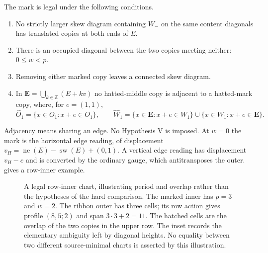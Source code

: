 \documentclass[11pt,a4paper]{amsart}
\numberwithin{equation}{section}
\theoremstyle{plain}
\theoremstyle{definition}
\newcommand{\Z}{\mathbb Z}
\begin{document}
The mark is legal under the following conditions.
\begin{enumerate}
\item[(I)] No strictly larger skew diagram containing \(W_-\) on the same content
 diagonals has translated copies at both ends of \(E\).
\item[(II)] There is an occupied diagonal between the two copies meeting neither:
 \(0\le w<p\).
\item[(III)] Removing either marked copy leaves a connected skew diagram.
\item[(IV)] In \(\boldsymbol E=\bigcup_{k\in\Z}(E+kv)\) no hatted-middle copy
 is adjacent to a hatted-mark copy, where, for \(e=(1,1)\),
 \[
 \widehat O_1=\{x\in O_1:x+e\in O_1\},\qquad
 \widehat W_1=\{x\in\boldsymbol E:x+e\in W_1\}
       \cup\{x\in W_1:x+e\in\boldsymbol E\}.
 \]
\end{enumerate}
Adjacency means sharing an edge.  No Hypothesis V is imposed.
At \(w=0\) the mark is the horizontal edge reading, of displacement
\(v_H=\operatorname{ne}(E)-\operatorname{sw}(E)+(0,1)\).
A vertical edge reading has displacement \(v_H-e\) and is converted by the
ordinary gauge, which antitransposes the outer.
 gives a row-inner example.
\begin{figure}[!b]
\centering
{}
\caption{A legal row-inner chart, illustrating period and overlap rather than
 the hypotheses of the hard comparison.  The marked inner has \(p=3\) and \(w=2\).  The ribbon outer has three cells;
 its row action gives profile \((8,5;2)\) and span \(3\cdot3+2=11\).
 The hatched cells are the overlap of the two copies in the upper row.  The inset records the elementary
 ambiguity left by diagonal heights.  No equality between two different
 source-minimal charts is asserted by this illustration.}\label{fig:chart}
\end{figure}
\end{document}
